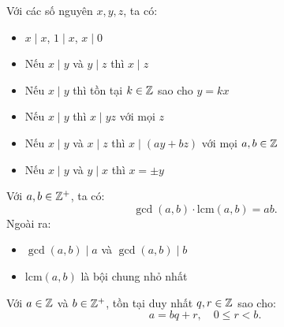\documentclass[../imo-training-open-book.tex]{subfiles}
\begin{document}
\vspace{1em}

\begin{theorem*}
    \label{theorem:basic-divisibility-properties}
    Với các số nguyên \( x, y, z \), ta có:
    \begin{itemize}[topsep=0pt, itemsep=0pt]
        \item \( x \mid x \), \( 1 \mid x \), \( x \mid 0 \)
        \item Nếu \( x \mid y \) và \( y \mid z \) thì \( x \mid z \)
        \item Nếu \( x \mid y \) thì tồn tại \( k \in \mathbb Z \) sao cho \( y = kx \)
        \item Nếu \( x \mid y \) thì \( x \mid yz \) với mọi \( z \)
        \item Nếu \( x \mid y \) và \( x \mid z \) thì \( x \mid (ay + bz) \) với mọi \( a, b \in \mathbb Z \)
        \item Nếu \( x \mid y \) và \( y \mid x \) thì \( x = \pm y \)
    \end{itemize}
\end{theorem*}

\vspace{1em}

\begin{theorem*}
    \label{theorem:gcd-lcm-properties}
    Với \( a, b \in \mathbb Z^+ \), ta có:
    \[
        \gcd(a, b) \cdot \mathrm{lcm}(a, b) = ab.
    \]
    Ngoài ra:
    \begin{itemize}[topsep=0pt, itemsep=0pt]
        \item \( \gcd(a, b) \mid a \) và \( \gcd(a, b) \mid b \)
        \item \( \mathrm{lcm}(a, b) \) là bội chung nhỏ nhất
    \end{itemize}
\end{theorem*}

\vspace{1em}

\begin{theorem*}
    \label{theorem:euclidean-division}
    Với \( a \in \mathbb Z \) và \( b \in \mathbb Z^+ \), tồn tại duy nhất \( q, r \in \mathbb Z \) sao cho:
    \[
        a = bq + r,\quad 0 \le r < b.
    \]
\end{theorem*}

\vspace{1em}
\end{document}
